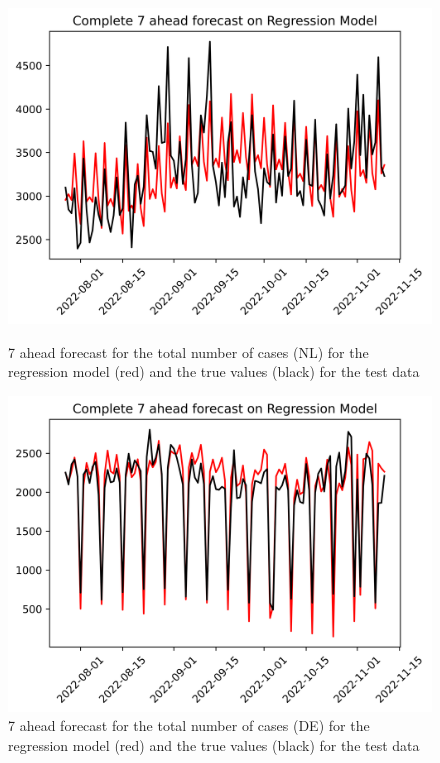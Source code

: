 \begin{figure}

\begin{minipage}{.45\textwidth}
  \centering
  \includegraphics[width=\linewidth]{pics/7_ah/Complete_7_ahead_Regression Model.png}
  \caption{7 ahead forecast for the total number of cases (NL) for the regression model (red) and the true values (black) for the test data}
  \label{fig:tot_cases_fc_7_RM}
\end{minipage}
\begin{minipage}{.45\textwidth}
  \centering
  \includegraphics[width=\linewidth]{pics/7_ah/DE_Complete_7_ahead_Regression Model.png}
  \caption{7 ahead forecast for the total number of cases (DE) for the regression model (red) and the true values (black) for the test data}
  \label{fig:tot_cases_fc_7_RM_DE}
\end{minipage}

\end{figure}
